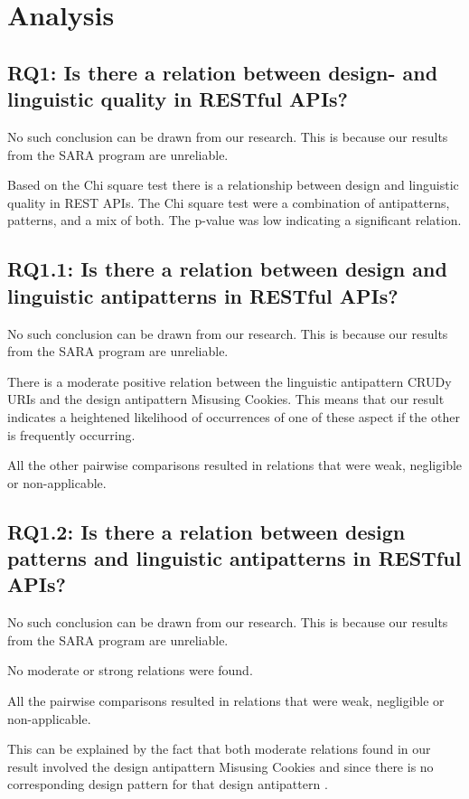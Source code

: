 \section{Analysis}

\subsection{RQ1: Is there a relation between design- and linguistic quality in RESTful APIs?}

No such conclusion can be drawn from our research. This is because our results from the SARA program are unreliable.

Based on the Chi square test there is a relationship between design and linguistic quality in REST APIs. The Chi square test were a combination of antipatterns, patterns, and a mix of both. The p-value was low indicating a significant relation.

\subsection{RQ1.1: Is there a relation between design and linguistic antipatterns in RESTful APIs?}

No such conclusion can be drawn from our research. This is because our results from the SARA program are unreliable.


There is a moderate positive relation between the linguistic antipattern CRUDy URIs and the design antipattern Misusing Cookies. This means that our result indicates a heightened likelihood of occurrences of one of these aspect if the other is frequently occurring. 

All the other pairwise comparisons resulted in relations that were weak, negligible or non-applicable. 


\subsection{RQ1.2: Is there a relation between design patterns and linguistic antipatterns in RESTful APIs?}

No such conclusion can be drawn from our research. This is because our results from the SARA program are unreliable.

No moderate or strong relations were found.


All the pairwise comparisons resulted in relations that were weak, negligible or non-applicable. 

This can be explained by the fact that both moderate relations found in our result involved the design antipattern Misusing Cookies and since there is no corresponding design pattern for that design antipattern \cite{design}.



